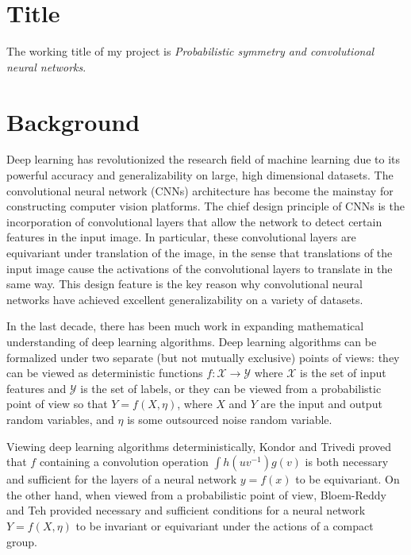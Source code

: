 \documentclass[]{STAT_547C}
\begin{document}
\vspace{-2cm}


\section{Title}

The working title of my project is \emph{Probabilistic symmetry and convolutional neural networks}.  

\section{Background}

Deep learning has revolutionized the research field of machine learning due to its powerful accuracy and generalizability on large, high dimensional datasets.
The convolutional neural network (CNNs) architecture has become the mainstay for constructing computer vision platforms.
The chief design principle of CNNs is the incorporation of convolutional layers that allow the network to detect certain features in the input image.
In particular, these convolutional layers are equivariant under translation of the image, in the sense that translations of the input image cause the activations of the convolutional layers to translate in the same way.
This design feature is the key reason why convolutional neural networks have achieved excellent generalizability on a variety of datasets.

In the last decade, there has been much work in expanding mathematical understanding of deep learning algorithms.
Deep learning algorithms can be formalized under two separate (but not mutually exclusive) points of views: they can be viewed as deterministic functions $f: \mathcal{X} \to \mathcal{Y}$ where $\mathcal{X}$ is the set of input features and $\mathcal{Y}$ is the set of labels, or they can be viewed from a probabilistic point of view so that $Y = f(X, \eta)$, where $X$ and $Y$ are the input and output random variables, and $\eta$ is some outsourced noise random variable.

Viewing deep learning algorithms deterministically, Kondor and Trivedi \cite{kondor2018generalization} proved that $f$ containing a convolution operation $\int h(uv^{-1})g(v)$ is both necessary and sufficient for the layers of a neural network $y = f(x)$ to be equivariant.
On the other hand, when viewed from a probabilistic point of view, Bloem-Reddy and Teh \cite{bloemreddy2019probabilistic} provided necessary and sufficient conditions for a neural network $Y = f(X, \eta)$ to be invariant or equivariant under the actions of a compact group.
\end{document}
